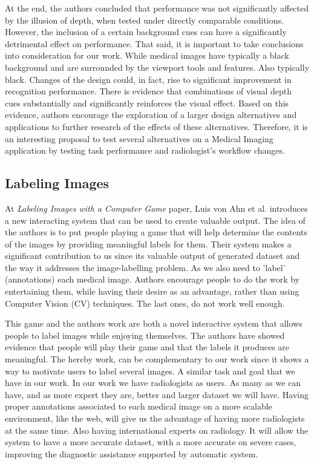 \clearpage

At the end, the authors concluded that performance was not significantly affected by the illusion of depth, when tested under directly comparable conditions. However, the inclusion of a certain background cues can have a significantly detrimental effect on performance. That said, it is important to take conclusions into consideration for our work. While medical images have typically a black background and are surrounded by the viewport tools and features. Also typically black. Changes of the design could, in fact, rise to significant improvement in recognition performance. There is evidence that combinations of visual depth cues substantially and significantly reinforces the visual effect. Based on this evidence, authors encourage the exploration of a larger design alternatives and applications to further research of the effects of these alternatives. Therefore, it is an interesting proposal to test several alternatives on a Medical Imaging application by testing task performance and radiologist's workflow changes.

\subsection{Labeling Images}

At \textit{Labeling Images with a Computer Game} paper, Luis von Ahn et al. \cite{von2004labeling} introduces a new interacting system that can be used to create valuable output. The idea of the authors is to put people playing a game that will help determine the contents of the images by providing meaningful labels for them. Their system makes a significant contribution to us since its valuable output of generated dataset and the way it addresses the image-labelling problem. As we also need to 'label' (annotations) each medical image. Authors encourage people to do the work by entertaining them, while having their desire as an advantage, rather than using Computer Vision (CV) techniques. The last ones, do not work well enough.

This game and the authors work are both a novel interactive system that allows people to label images while enjoying themselves. The authors have showed evidence that people will play their game and that the labels it produces are meaningful. The hereby work, can be complementary to our work since it shows a way to motivate users to label several images. A similar task and goal that we have in our work. In our work we have radiologists as users. As many as we can have, and as more expert they are, better and larger dataset we will have. Having proper annotations associated to each medical image on a more scalable environment, like the web, will give us the advantage of having more radiologists at the same time. Also having international experts on radiology. It will allow the system to have a more accurate dataset, with a more accurate on severe cases, improving the diagnostic assistance supported by automatic system.

